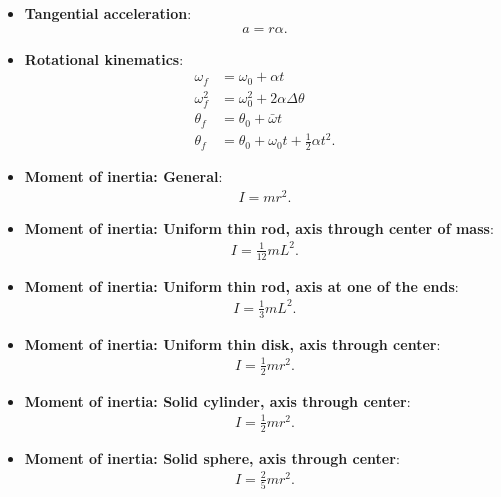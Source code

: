 \documentclass{report}
\begin{document}
\begin{itemize}
\begin{itemize}
            \end{itemize}
        \item \textbf{Tangential acceleration}:
            \begin{align*}
                a = r\alpha
            .\end{align*}
        \item \textbf{Rotational kinematics}:
            \begin{align*}
                \omega_{f} &= \omega_{0} + \alpha t \\
                \omega_{f}^{2} &= \omega_{0}^{2} + 2\alpha\Delta \theta  \\
                \theta_{f} &= \theta_{0} + \bar{\omega} t \\
                \theta_{f} &= \theta_{0} + \omega_{0}t + \frac{1}{2}\alpha t^{2}
            .\end{align*}
        \item \textbf{Moment of inertia: General}:
            \begin{align*}
                I = mr^{2}
            .\end{align*}
        \item \textbf{Moment of inertia: Uniform thin rod, axis through center of mass}:
            \begin{align*}
                I = \frac{1}{12}mL^{2}
            .\end{align*}
        \item \textbf{Moment of inertia: Uniform thin rod, axis at one of the ends}:
            \begin{align*}
                I = \frac{1}{3}mL^{2}
            .\end{align*}
        \item \textbf{Moment of inertia: Uniform thin disk, axis through center}:
            \begin{align*}
                I = \frac{1}{2}mr^{2}
            .\end{align*}
        \item \textbf{Moment of inertia: Solid cylinder, axis through center}:
            \begin{align*}
                I = \frac{1}{2}mr^{2}
            .\end{align*}
        \item \textbf{Moment of inertia: Solid sphere, axis through center}:
            \begin{align*}
                I = \frac{2}{5}mr^{2}
            .\end{align*}

\end{itemize}
\end{document}
